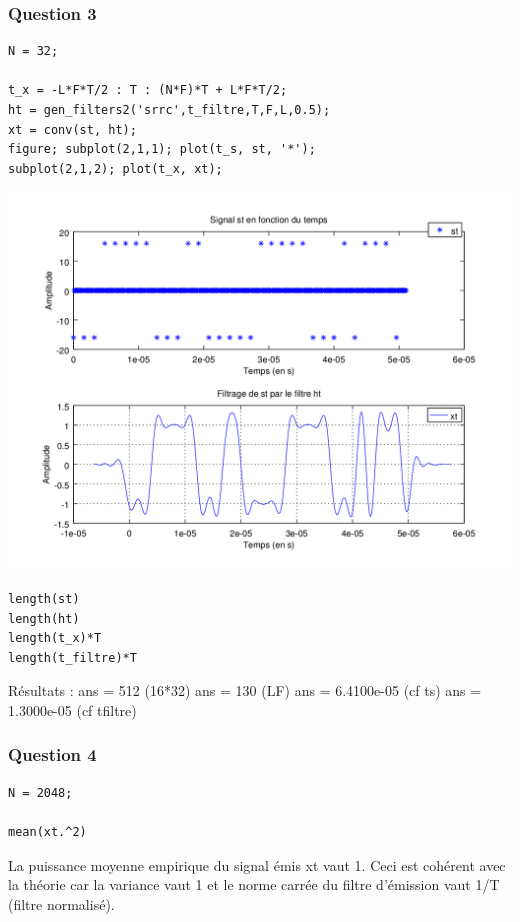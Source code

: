 \documentclass{acm_proc_article-sp}
\begin{document}
\subsubsection{Question 3}
\begin{center}
\begin{lstlisting}
N = 32;

t_x = -L*F*T/2 : T : (N*F)*T + L*F*T/2;
ht = gen_filters2('srrc',t_filtre,T,F,L,0.5);
xt = conv(st, ht);
figure; subplot(2,1,1); plot(t_s, st, '*');
subplot(2,1,2); plot(t_x, xt);
\end{lstlisting}

\includegraphics[scale=0.45]{conv_3_3.png}

\begin{lstlisting}
length(st)
length(ht)
length(t_x)*T
length(t_filtre)*T
\end{lstlisting}
\end{center}

Résultats : ans =  512 (16*32)
ans =  130 (LF)
ans =    6.4100e-05 (cf ts)
ans =    1.3000e-05 (cf tfiltre)

\subsubsection{Question 4}
\begin{lstlisting}
N = 2048;

mean(xt.^2)
\end{lstlisting}

La puissance moyenne empirique du signal émis xt vaut 1. Ceci est cohérent avec la théorie car la variance vaut 1 et le norme carrée du filtre d'émission vaut 1/T (filtre normalisé).
\end{document}
